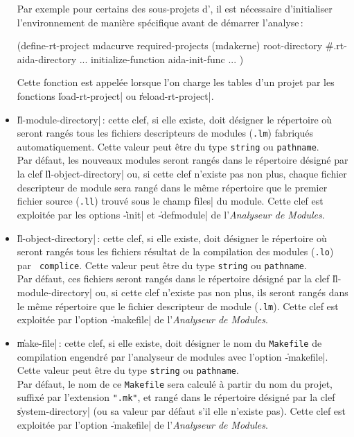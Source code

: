 \begin{itemize}
Par exemple pour certains des sous-projets d'\Aida, 
il est n\'{e}cessaire d'initialiser l'environnement
de mani\`{e}re sp\'{e}cifique avant de d\'{e}marrer l'analyse\,:

\begin{Code*}
(define-rt-project mdacurve
  required-projects (mdakerne)
  root-directory #.rt-aida-directory
  ...
  initialize-function aida-init-func
  ...
  )
\end{Code*}

Cette fonction est appel\'{e}e lorsque l'on charge les tables d'un projet
par les fonctions \|load-rt-project| ou \|reload-rt-project|.

\item {\Large \|ll-module-directory|}\,: cette clef, si elle existe,
doit d\'{e}signer le r\'{e}pertoire o\`{u} seront rang\'{e}s tous les fichiers
descripteurs de modules ({\tt .lm}) fabriqu\'{e}s automatiquement. Cette
valeur peut \^{e}tre du type {\tt string} ou {\tt pathname}. \\
Par d\'{e}faut, les nouveaux modules seront
rang\'{e}s dans le r\'{e}pertoire d\'{e}sign\'{e} par la clef
\|ll-object-directory| ou, si cette clef n'existe pas non plus, chaque
fichier descripteur de module sera rang\'{e} dans le m\^{e}me r\'{e}pertoire
que le premier fichier source ({\tt .ll}) trouv\'{e} sous le champ \|files|
du module.
Cette clef est exploit\'{e}e par les options \|-init| et \|-defmodule| de
l'{\em Analyseur de Modules}.

\item {\Large \|ll-object-directory|}\,: cette clef, si elle existe,
doit d\'{e}signer le r\'{e}pertoire o\`{u} seront rang\'{e}s tous les fichiers
r\'{e}sultat de la compilation des modules ({\tt .lo}) par {\tt
complice}. Cette
valeur peut \^{e}tre du type {\tt string} ou {\tt pathname}.  \\
Par d\'{e}faut, ces fichiers seront
rang\'{e}s dans le r\'{e}pertoire d\'{e}sign\'{e} par la clef
\|ll-module-directory| ou, si cette clef n'existe pas non plus, ils
seront rang\'{e}s dans le m\^{e}me r\'{e}pertoire que le fichier descripteur
de module ({\tt .lm}).
Cette clef est exploit\'{e}e par l'option \|-makefile| de
l'{\em Analyseur de Modules}.

\item {\Large \|make-file|}\,: cette clef, si elle existe, doit
d\'{e}signer le nom du {\tt Makefile} de compilation engendr\'{e} par l'analyseur
de modules avec l'option \|-makefile|. Cette
valeur peut \^{e}tre du type {\tt string} ou {\tt pathname}. \\
Par d\'{e}faut, le nom de ce {\tt Makefile} sera calcul\'{e} \`{a}
partir du nom du projet, suffix\'{e} par l'extension {\tt ".mk"}, et
rang\'{e} dans le r\'{e}pertoire d\'{e}sign\'{e} par la clef \|system-directory|
(ou sa valeur par d\'{e}faut s'il elle n'existe pas).
Cette clef est exploit\'{e}e par l'option \|-makefile| de l'{\em Analyseur de
Modules}.


\end{itemize}
